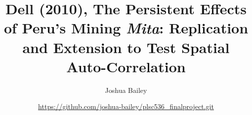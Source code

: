 \documentclass[a4paper,11pt]{article}
\title{Dell (2010), The Persistent Effects of Peru's Mining \emph{Mita}: Replication and Extension to Test Spatial Auto-Correlation}
\author{Joshua Bailey
\and \small \url{https://github.com/joshua-bailey/plsc536_finalproject.git}}
\begin{document}

 
\newpage 

\maketitle








\pagebreak

\nocite{*}
\printbibliography 

\pagebreak


\end{document}
